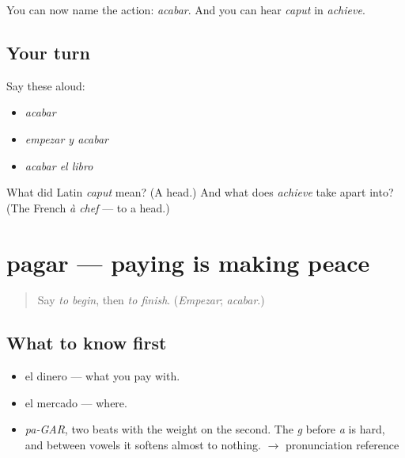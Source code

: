 \begin{grammarlens}[title={What you've built}]
You can now name the action: \emph{acabar}. And you can hear \emph{caput} in \emph{achieve}.
\end{grammarlens}

\subsection*{Your turn}
Say these aloud:

\begin{itemize}
\raggedright
  \item \emph{acabar}
  \item \emph{empezar y acabar}
  \item \emph{acabar el libro}
\end{itemize}

\begin{tcolorbox}[breakable,colback=teal!4,colframe=teal!35!black,title={Before you move on}]
What did Latin \emph{caput} mean? (A head.) And what does \emph{achieve} take apart into? (The French \emph{à chef} — to a head.)
\end{tcolorbox}
\section[pagar]{pagar — paying is making peace}

\label{lesson:ES-C382-pagar}



\begin{quote}
Say \emph{to begin}, then \emph{to finish}. (\emph{Empezar}; \emph{acabar}.)
\end{quote}

\subsection*{What to know first}
\begin{itemize}
\raggedright
  \item el dinero — what you pay with.
  \item el mercado — where.
\end{itemize}

\begin{sounds}
\begin{itemize}
\raggedright
  \item \emph{pa-GAR}, two beats with the weight on the second. The \emph{g} before \emph{a} is hard, and between vowels it softens almost to nothing. $\to$ pronunciation reference
\end{itemize}
\end{sounds}

